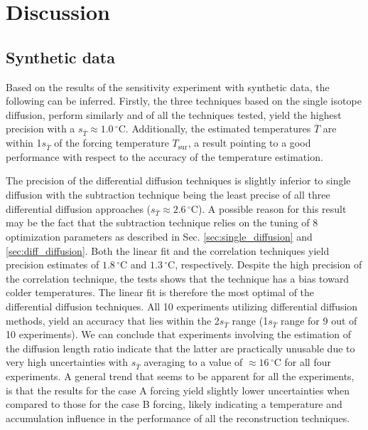\documentclass[11pt, draftcls, onecolumn]{IEEEtran} %
\numberwithin{equation}{section}
\numberwithin{table}{section}
\numberwithin{figure}{section}
\begin{document}

\section{Discussion}\label{sec:discussion}

\subsection{Synthetic data}\label{sec:discussion_synthetic}
Based on the results of the sensitivity experiment with 
synthetic data, the following can be inferred. Firstly, the three techniques based on the 
single isotope diffusion, perform similarly and of all the techniques
tested, yield the highest precision with a $s_{\bar{T}} \approx 1.0 \,{}^{\circ} \text{C}$.
Additionally, the estimated temperatures $\overline{T}$ are within 1$s_{\bar{T}}$
of the forcing temperature  $T_{\text{sur}}$, a result pointing to a good performance with respect to 
the accuracy of the temperature estimation. 

The precision of the differential diffusion techniques is slightly
inferior to single diffusion with the subtraction 
technique being the least precise of all three differential diffusion approaches ($s_{\bar{T}} \approx 2.6 \,{}^{\circ} \text{C}$). 
A possible reason for this result may be the fact that the subtraction technique relies on the 
tuning of 8 optimization parameters as described in Sec. \ref{sec:single_diffusion} and 
\ref{sec:diff_diffusion}.
Both the linear fit and the correlation techniques yield precision estimates of $1.8 \,{}^{\circ} \text{C}$ and 
 $1.3 \,{}^{\circ} \text{C}$, respectively.
Despite the high precision of the correlation technique, the tests shows that the technique has a bias toward colder temperatures. 
The linear fit is therefore the most optimal of the differential diffusion techniques.
All 10 experiments utilizing differential diffusion methods, yield an accuracy that lies within the 2$s_{\bar{T}}$ range
(1$s_{\bar{T}}$ range for 9 out of 10 experiments). We can conclude that experiments involving the estimation 
of the diffusion length ratio indicate that the latter are practically unusable due to very high uncertainties
with $s_{\bar{T}}$ averaging to a value of  $\approx 16 \,{}^{\circ} \text{C}$ for all four experiments.
A general trend that seems to be apparent for all the experiments, is that the results for the case A forcing yield
slightly lower uncertainties when compared to those for the case B forcing, likely indicating a
temperature and accumulation influence in the performance of all the reconstruction techniques. 
\end{document}
